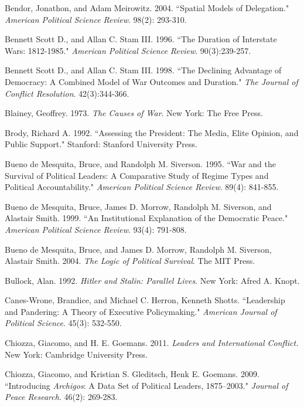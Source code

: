 \documentclass[11pt,]{article}
\begin{document}
\begin{thebibliography}{}

\bibitem{} Bendor, Jonathon, and Adam Meirowitz.  2004.  ``Spatial Models of Delegation."  \textit{American Political Science Review}.  98(2): 293-310.

\bibitem{} Bennett Scott D., and Allan C. Stam III.  1996.  ``The Duration of Interstate Wars: 1812-1985."  \textit{American Political Science Review}.  90(3):239-257.

\bibitem{} Bennett Scott D., and Allan C. Stam III.  1998.  ``The Declining Advantage of Democracy: A Combined Model of War Outcomes and Duration."  \textit{The Journal of Conflict Resolution}.  42(3):344-366.

\bibitem{} Blainey, Geoffrey.  1973.  \textit{The Causes of War}.  New York: The Free Press.

\bibitem{} Brody, Richard A.  1992.  ``Assessing the President: The Media, Elite Opinion, and Public Support."  Stanford: Stanford University Press.

\bibitem{} Bueno de Mesquita, Bruce, and Randolph M. Siverson.  1995.  ``War and the Survival of Political Leaders: A Comparative Study of Regime Types and Political Accountability."  \textit{American Political Science Review}.  89(4): 841-855.

\bibitem{} Bueno de Mesquita, Bruce, James D. Morrow, Randolph M. Siverson, and Alastair Smith.  1999. ``An Institutional Explanation of the Democratic Peace."  \textit{American Political Science Review}.  93(4):  791-808.

\bibitem{} Bueno de Mesquita, Bruce, and James D. Morrow, Randolph M. Siverson, Alastair Smith.  2004.  \textit{The Logic of Political Survival}.  The MIT Press.

\bibitem{} Bullock, Alan.  1992.  \textit{Hitler and Stalin: Parallel Lives}.  New York:  Afred A. Knopt.

\bibitem{} Canes-Wrone, Brandice, and Michael C. Herron, Kenneth Shotts.  ``Leadership and Pandering: A Theory of Executive Policymaking."  \textit{American Journal of Political Science}.  45(3): 532-550.

\bibitem{} Chiozza, Giacomo, and H. E. Goemans.  2011.  \textit{Leaders and International Conflict.} New York: Cambridge University Press.

\bibitem{} Chiozza, Giacomo, and Kristian S. Gleditsch, Henk E. Goemans.  2009.  ``Introducing \textit{Archigos}: A Data Set of Political Leaders, 1875--2003."  \textit{Journal of Peace Research}.  46(2): 269-283.


\end{thebibliography}
\end{document}
